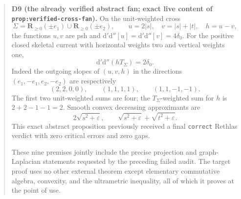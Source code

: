 \begin{quote}
\textbf{D9 (the already verified abstract fan; exact live content of
\texttt{prop:verified-cross-fan}).}
On the unit-weighted cross
\[
 \Sigma=\mathbf R_{\geq0}(\pm e_1)\cup
        \mathbf R_{\geq0}(\pm e_2),
 \qquad u=2|s|,\quad v=|s|+|t|,\quad h=u-v,
\]
the functions $u,v$ are psh and
$\mathrm d'\mathrm d''[u]=\mathrm d'\mathrm d''[v]=4\delta_0$.
For the positive closed skeletal current with horizontal weights two and
vertical weights one,
\[
                   \mathrm d'\mathrm d''(hT_\Sigma)=2\delta_0.
\]
Indeed the outgoing slopes of $(u,v,h)$ in the directions
$(e_1,-e_1,e_2,-e_2)$ are respectively
\[
 (2,2,0,0),\qquad(1,1,1,1),\qquad(1,1,-1,-1).
\]
The first two unit-weighted sums are four; the $T_\Sigma$-weighted sum for
$h$ is $2+2-1-1=2$.  Smooth convex decreasing approximants are
\[
 2\sqrt{s^2+\varepsilon},\qquad
 \sqrt{s^2+\varepsilon}+\sqrt{t^2+\varepsilon}.
\]
This exact abstract proposition previously received a final
\texttt{correct} Rethlas verdict with zero critical errors and zero gaps.

These nine premises jointly include the precise projection and
graph-Laplacian statements requested by the preceding failed audit.  The
target proof uses no other external theorem except elementary commutative
algebra, convexity, and the ultrametric inequality, all of which it proves
at the point of use.
\end{quote}
